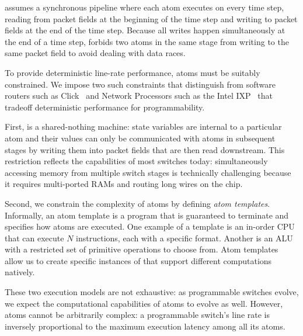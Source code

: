 \smallskip
{}
\absmachine assumes a synchronous pipeline where each atom executes on every
time step, reading from packet fields at the beginning of the time step and
writing to packet fields at the end of the time step. Because all writes happen
simultaneously at the end of a time step, \absmachine forbids two atoms in the
same stage from writing to the same packet field to avoid dealing with data
races.

To provide deterministic line-rate performance, atoms must be suitably
constrained.  We impose two such constraints that distinguish \absmachine from
software routers such as Click~\cite{click} and Network Processors such as the
Intel IXP~\cite{ixp4xx} that tradeoff deterministic performance for
programmability.

First, \absmachine is a shared-nothing machine: state variables are internal to
a particular atom and their values can only be communicated with atoms in
subsequent stages by writing them into packet fields that are then read
downstream.  This restriction reflects the capabilities of most switches today:
simultaneously accessing memory from multiple switch stages is technically
challenging because it requires multi-ported RAMs and routing long wires on the
chip.

Second, we constrain the complexity of atoms by defining {\it atom templates}.
Informally, an atom template is a program that is guaranteed to terminate and
specifies how atoms are executed. One example of a template is an in-order CPU
that can execute $N$ instructions, each with a specific format. Another is an
ALU with a restricted set of primitive operations to choose from. Atom
templates allow us to create specific instances of \absmachine that support
different computations natively.

These two execution models are not exhaustive: as programmable switches evolve,
we expect the computational capabilities of atoms to evolve as well. However,
atoms cannot be arbitrarily complex: a programmable switch's line rate is
inversely proportional to the maximum execution latency among all its atoms.
